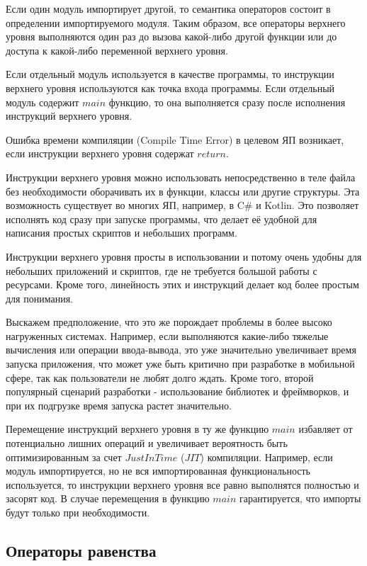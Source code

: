 \documentclass{mipt-thesis-bs}
\begin{document}
Если один модуль импортирует другой, то семантика операторов
состоит в определении импортируемого модуля.
Таким образом, все операторы верхнего уровня выполняются один раз до
вызова какой-либо другой функции или до доступа к какой-либо
переменной верхнего уровня.

Если отдельный модуль используется в качестве программы, то инструкции
верхнего уровня используются как точка входа программы. Если отдельный
модуль содержит $main$ функцию, то она выполняется сразу после
исполнения инструкций верхнего уровня.

Ошибка времени компиляции (Compile Time Error) в целевом ЯП возникает, если
инструкции верхнего уровня содержат $return$.

Инструкции верхнего уровня можно использовать
непосредственно в теле файла без необходимости оборачивать их в функции,
классы или другие структуры. Эта возможность существует во многих ЯП, например,
в C\# и Kotlin. Это позволяет исполнять код сразу при запуске программы, что делает её
удобной для написания простых скриптов и небольших программ.

Инструкции верхнего уровня просты в использовании и потому очень удобны
для небольших приложений и скриптов, где не требуется большой работы
с ресурсами. Кроме того, линейность этих и инструкций делает код
более простым для понимания.

Выскажем предположение, что это же порождает проблемы в более
высоко нагруженных системах. Например, если выполняются какие-либо
тяжелые вычисления или операции ввода-вывода, это уже значительно
увеличивает время запуска приложения, что может уже быть критично
при разработке в мобильной сфере, так как пользователи не любят
долго ждать. Кроме того, второй популярный сценарий разработки -
использование библиотек и фреймворков, и при их подгрузке время
запуска растет значительно.

Перемещение инструкций верхнего уровня
в ту же функцию $main$ избавляет от потенциально лишних операций
и увеличивает вероятность быть оптимизированным за счет $Just In Time$
($JIT$) компиляции.
Например, если модуль импортируется, но не вся импортированная
функциональность используется, то инструкции верхнего уровня все
равно выполнятся полностью и засорят код. В случае перемещения в
функцию $main$ гарантируется, что импорты будут  только
при необходимости.

\subsection{Операторы равенства}
\end{document}
